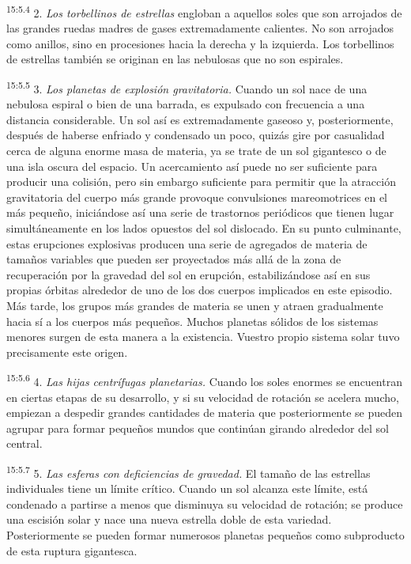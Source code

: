 \par
\textsuperscript{15:5.4} 2. \textit{Los torbellinos de estrellas} engloban a aquellos soles que son arrojados de las grandes ruedas madres de gases extremadamente calientes. No son arrojados como anillos, sino en procesiones hacia la derecha y la izquierda. Los torbellinos de estrellas también se originan en las nebulosas que no son espirales.

\par
\textsuperscript{15:5.5} 3. \textit{Los planetas de explosión gravitatoria.} Cuando un sol nace de una nebulosa espiral o bien de una barrada, es expulsado con frecuencia a una distancia considerable. Un sol así es extremadamente gaseoso y, posteriormente, después de haberse enfriado y condensado un poco, quizás gire por casualidad cerca de alguna enorme masa de materia, ya se trate de un sol gigantesco o de una isla oscura del espacio. Un acercamiento así puede no ser suficiente para producir una colisión, pero sin embargo suficiente para permitir que la atracción gravitatoria del cuerpo más grande provoque convulsiones mareomotrices en el más pequeño, iniciándose así una serie de trastornos periódicos que tienen lugar simultáneamente en los lados opuestos del sol dislocado. En su punto culminante, estas erupciones explosivas producen una serie de agregados de materia de tamaños variables que pueden ser proyectados más allá de la zona de recuperación por la gravedad del sol en erupción, estabilizándose así en sus propias órbitas alrededor de uno de los dos cuerpos implicados en este episodio. Más tarde, los grupos más grandes de materia se unen y atraen gradualmente hacia sí a los cuerpos más pequeños. Muchos planetas sólidos de los sistemas menores surgen de esta manera a la existencia. Vuestro propio sistema solar tuvo precisamente este origen.

\par
\textsuperscript{15:5.6} 4. \textit{Las hijas centrífugas planetarias.} Cuando los soles enormes se encuentran en ciertas etapas de su desarrollo, y si su velocidad de rotación se acelera mucho, empiezan a despedir grandes cantidades de materia que posteriormente se pueden agrupar para formar pequeños mundos que continúan girando alrededor del sol central.

\par
\textsuperscript{15:5.7} 5. \textit{Las esferas con deficiencias de gravedad.} El tamaño de las estrellas individuales tiene un límite crítico. Cuando un sol alcanza este límite, está condenado a partirse a menos que disminuya su velocidad de rotación; se produce una escisión solar y nace una nueva estrella doble de esta variedad. Posteriormente se pueden formar numerosos planetas pequeños como subproducto de esta ruptura gigantesca.

